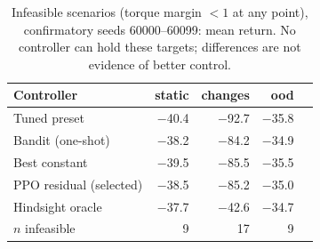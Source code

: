 \begin{table}[t]
\centering
\small
\caption{Infeasible scenarios (torque margin $<1$ at any point), confirmatory seeds 60000--60099: mean return. No controller can hold these targets; differences are not evidence of better control.}
\label{tab:infeasible}
\begin{tabular}{lrrrr}
\toprule
Controller & static & changes & ood & \\
\midrule
Tuned preset & $-$40.4 & $-$92.7 & $-$35.8 & \\
Bandit (one-shot) & $-$38.2 & $-$84.2 & $-$34.9 & \\
Best constant & $-$39.5 & $-$85.5 & $-$35.5 & \\
PPO residual (selected) & $-$38.5 & $-$85.2 & $-$35.0 & \\
Hindsight oracle & $-$37.7 & $-$42.6 & $-$34.7 & \\
\midrule
$n$ infeasible & 9 & 17 & 9 & \\
\bottomrule
\end{tabular}
\end{table}
